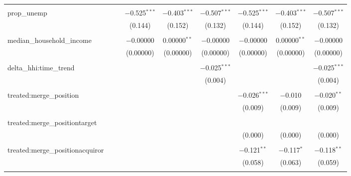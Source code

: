 \begin{table}[H]
{\begin{tabular}{@{\extracolsep{5pt}}lcccccccc}
   & & & & & & & & \\  

  prop\_unemp &  &  & $-$0.525$^{***}$ & $-$0.403$^{***}$ & $-$0.507$^{***}$ & $-$0.525$^{***}$ & $-$0.403$^{***}$ & $-$0.507$^{***}$ \\  

   &  &  & (0.144) & (0.152) & (0.132) & (0.144) & (0.152) & (0.132) \\  

   & & & & & & & & \\  

  median\_household\_income &  &  & $-$0.00000 & 0.00000$^{**}$ & $-$0.00000 & $-$0.00000 & 0.00000$^{**}$ & $-$0.00000 \\  

   &  &  & (0.00000) & (0.00000) & (0.00000) & (0.00000) & (0.00000) & (0.00000) \\  

   & & & & & & & & \\  

  delta\_hhi:time\_trend &  &  &  &  & $-$0.025$^{***}$ &  &  & $-$0.025$^{***}$ \\  

   &  &  &  &  & (0.004) &  &  & (0.004) \\  

   & & & & & & & & \\  

  treated:merge\_position &  &  &  &  &  & $-$0.026$^{***}$ & $-$0.010 & $-$0.020$^{**}$ \\  

   &  &  &  &  &  & (0.009) & (0.009) & (0.009) \\  

   & & & & & & & & \\  

  treated:merge\_positiontarget &  &  &  &  &  &  &  &  \\  

   &  &  &  &  &  & (0.000) & (0.000) & (0.000) \\  

   & & & & & & & & \\  

  treated:merge\_positionacquiror &  &  &  &  &  & $-$0.121$^{**}$ & $-$0.117$^{*}$ & $-$0.118$^{**}$ \\  

   &  &  &  &  &  & (0.058) & (0.063) & (0.059) \\  

   & & & & & & & & \\  


\end{tabular}}
\end{table}
